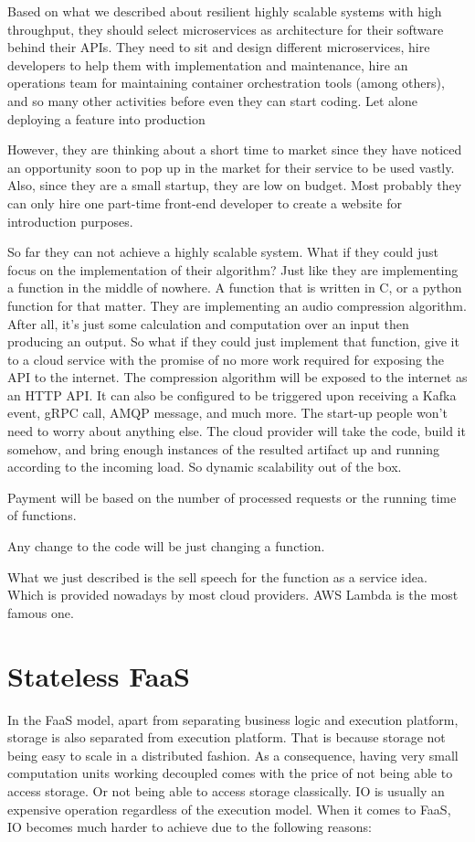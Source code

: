 \documentclass[a4]{report}
\begin{document}
    Based on what we described about resilient highly scalable systems with high throughput, they should select
    microservices as architecture for their software behind their APIs.
    They need to sit and design different microservices, hire developers to help them with implementation and
    maintenance, hire an operations team for maintaining container orchestration tools (among others), and so many
    other activities before even they can start coding.
    Let alone deploying a feature into production

    However, they are thinking about a short time to market since they have noticed an opportunity soon to pop up in
    the market for their service to be used vastly.
    Also, since they are a small startup, they are low on budget.
    Most probably they can only hire one part-time front-end developer to create a website for introduction purposes.

    So far they can not achieve a highly scalable system.
    What if they could just focus on the implementation of their algorithm?
    Just like they are implementing a function in the middle of nowhere.
    A function that is written in C, or a python function for that matter.
    They are implementing an audio compression algorithm.
    After all, it's just some calculation and computation over an input then producing an output.
    So what if they could just implement that function, give it to a cloud service with the promise of no more work required for exposing the API to the internet.
    The compression algorithm will be exposed to the internet as an HTTP API.
    It can also be configured to be triggered upon receiving a Kafka event, gRPC call, AMQP message, and much more.
    The start-up people won't need to worry about anything else.
    The cloud provider will take the code, build it somehow, and bring enough instances of the resulted artifact up and running according to the incoming load.
    So dynamic scalability out of the box.

    Payment will be based on the number of processed requests or the running time of functions.

    Any change to the code will be just changing a function.

    What we just described is the sell speech for the function as a service idea.
    Which is provided nowadays by most cloud providers.
    AWS Lambda is the most famous one.


    \section{Stateless FaaS}
    In the FaaS model, apart from separating business logic and execution platform, storage is also separated from
    execution platform.
    That is because storage not being easy to scale in a distributed fashion.
    As a consequence, having very small computation units working decoupled comes with the price of not being able to access storage.
    Or not being able to access storage classically.
    IO is usually an expensive operation regardless of the execution model.
    When it comes to FaaS, IO becomes much harder to achieve due to the following reasons:
\end{document}
